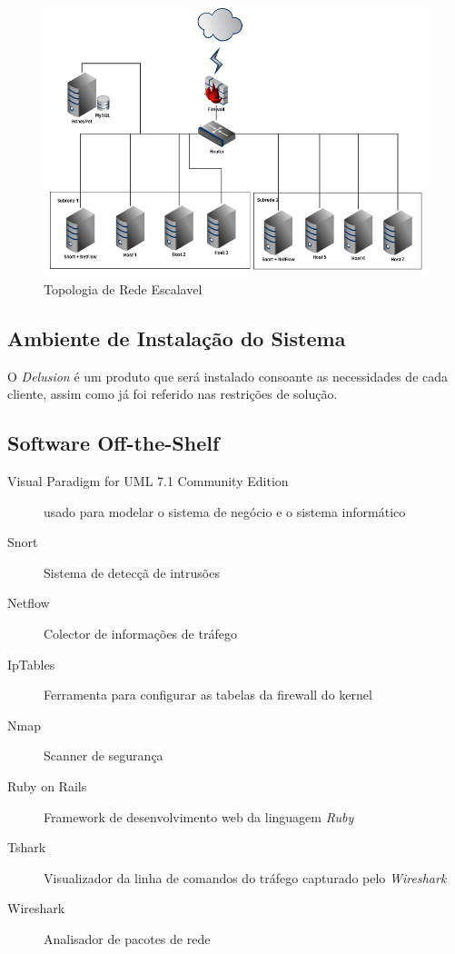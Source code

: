 \begin{figure}
	\centering	
	\includegraphics[scale=0.6]{images/topologia3.png}
	\caption{Topologia de Rede Escalavel}
    \label{img:topo2}
\end{figure}


\subsection{Ambiente de Instalação do Sistema}

    O \textit{Delusion} é um produto que será instalado consoante as necessidades de cada cliente, assim como já foi referido nas restrições de solução.

\subsection{Software Off-the-Shelf}
\begin{description}
    \item [Visual Paradigm for UML 7.1 Community Edition] usado para modelar o sistema de negócio e o sistema informático
    \item [Snort] Sistema de detecçã de intrusões
    \item [Netflow] Colector de informações de tráfego
    \item [IpTables] Ferramenta para configurar as tabelas da firewall do kernel
    \item [Nmap] Scanner de segurança
    \item [Ruby on Rails] Framework de desenvolvimento web da linguagem \textit{Ruby}
    \item [Tshark] Visualizador da linha de comandos do tráfego capturado pelo \textit{Wireshark}
    \item [Wireshark] Analisador de pacotes de rede
\end{description}

